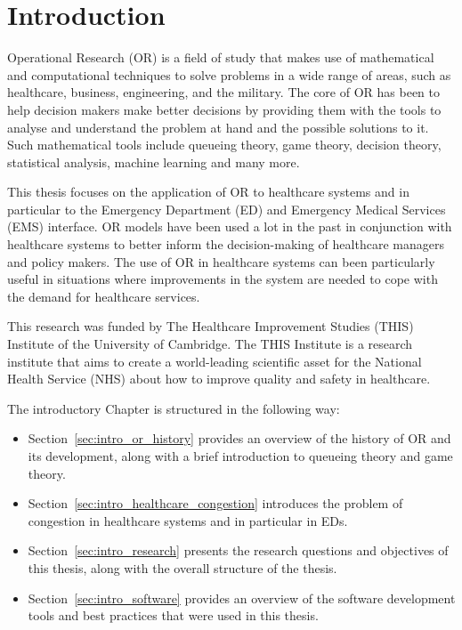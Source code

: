 \chapter{Introduction}\label{sec:introduction}

Operational Research (OR) is a field of study that makes use of mathematical
and computational techniques to solve problems in a wide range of areas, such
as healthcare, business, engineering, and the military.
The core of OR has been to help decision makers make better decisions by
providing them with the tools to analyse and understand the problem at hand and
the possible solutions to it.
Such mathematical tools include queueing theory, game theory, decision theory,
statistical analysis, machine learning and many more.

This thesis focuses on the application of OR to healthcare systems and in
particular to the Emergency Department (ED) and Emergency Medical Services
(EMS) interface.
OR models have been used a lot in the past in conjunction with healthcare
systems to better inform the decision-making of healthcare managers and
policy makers.
The use of OR in healthcare systems can been particularly useful in situations
where improvements in the system are needed to cope with the demand for
healthcare services.

This research was funded by The Healthcare Improvement Studies (THIS) Institute
of the University of Cambridge.
The THIS Institute is a research institute that aims to create a world-leading
scientific asset for the National Health Service (NHS) about how to improve
quality and safety in healthcare.

The introductory Chapter is structured in the following way:
\begin{itemize}
    \item Section~\ref{sec:intro_or_history} provides an overview of the
    history of OR and its development, along with a brief introduction to
    queueing theory and game theory.
    \item Section~\ref{sec:intro_healthcare_congestion} introduces the problem
    of congestion in healthcare systems and in particular in EDs.
    \item Section~\ref{sec:intro_research} presents the research questions and
    objectives of this thesis, along with the overall structure of the thesis.
    \item Section~\ref{sec:intro_software} provides an overview of the software
    development tools and best practices that were used in this thesis.
\end{itemize}


